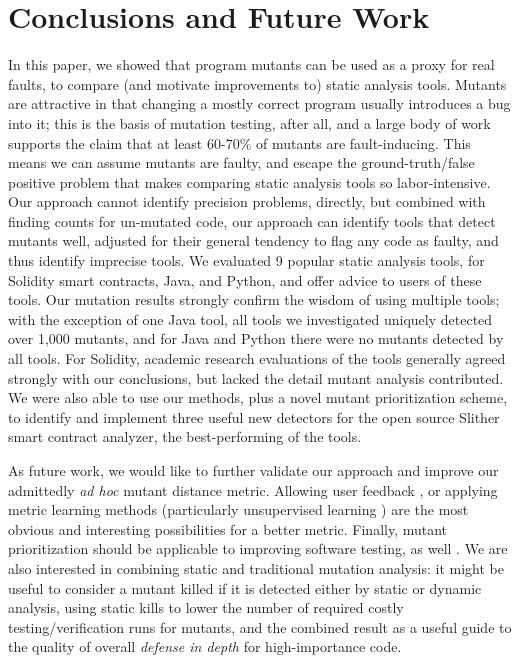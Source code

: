 \section{Conclusions and Future Work}

In this paper, we showed that program mutants can be used as a proxy
for real faults, to compare (and motivate improvements to) static
analysis tools.  Mutants are attractive in that changing a mostly
correct program usually introduces a bug into it; this is the basis of
mutation testing, after all, and a large body of work supports the
claim that at least 60-70\% of mutants are fault-inducing.   This
means we can assume mutants are faulty, and escape the
ground-truth/false positive problem that makes comparing static
analysis tools so labor-intensive.  Our approach cannot identify precision
problems, directly, but combined with finding counts for un-mutated
code, our approach can identify tools that detect mutants well,
adjusted for their general tendency to flag any code as faulty, and
thus identify imprecise tools.  We
evaluated 9 popular static analysis tools, for Solidity smart contracts, Java,
and Python, and offer advice to users of these tools.  Our mutation
results strongly confirm the wisdom of using multiple tools; with the
exception of one Java tool, all tools we investigated uniquely
detected over 1,000 mutants, and for Java and Python there were no
mutants detected by all tools. For Solidity,
academic research evaluations of the tools generally agreed strongly
with our conclusions, but lacked the detail mutant analysis contributed.
We were also able to use our methods, plus a novel mutant prioritization scheme, to
identify and implement three useful new detectors for the open source Slither smart contract
analyzer, the best-performing of the tools.

As future work, we would like to further validate our approach and
improve our admittedly \emph{ad hoc} mutant distance metric.  Allowing
user feedback \cite{EndUserMistake,OnlyOracle}, or applying metric
learning methods \cite{kulis2012metric} (particularly unsupervised
learning \cite{scholkopf1998nonlinear,tipping1999probabilistic}) are
the most obvious and interesting possibilities for a better metric.
Finally, mutant prioritization should be applicable to improving
software testing, as well \cite{groce2018verified}.  We are also interested in combining static and traditional mutation analysis: it might be useful to consider a mutant killed if it is detected either by static or dynamic analysis, using static kills to lower the number of required costly testing/verification runs for mutants, and the combined result as a useful guide to the quality of overall \emph{defense in depth} \cite{antunes2012defending,FC20} for high-importance code.